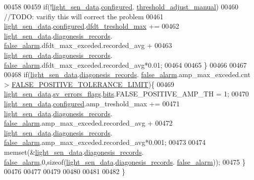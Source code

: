 \begin{DoxyCode}
00458 
00459          \textcolor{keywordflow}{if}(!\hyperlink{a00047_a53c98c9f84d5cecf0747bbe1f6b83696}{light\_sen\_data}.\hyperlink{a00024_a94b2d1f6ea4ab334c74d24984dd27843}{configured}.
      \hyperlink{a00021_a18e270a10094f045f20299b0f7e83085}{threshold\_adjust\_manual})
00460           \textcolor{comment}{//TODO: varifiy this will correct the problem}
00461           \hyperlink{a00047_a53c98c9f84d5cecf0747bbe1f6b83696}{light\_sen\_data}.\hyperlink{a00024_a94b2d1f6ea4ab334c74d24984dd27843}{configured}.\hyperlink{a00021_adf9a37828e447378b1d533185213316d}{dfdt\_treshold\_max} +=
00462           \hyperlink{a00047_a53c98c9f84d5cecf0747bbe1f6b83696}{light\_sen\_data}.\hyperlink{a00024_a7ae905b560513ad201e58c2f63375030}{diagonesis\_records}.
      \hyperlink{a00017_a799f50625c0c03f9404a59287810113d}{false\_alarm}.dfdt\_max\_exceded.recorded\_avg +
00463           \hyperlink{a00047_a53c98c9f84d5cecf0747bbe1f6b83696}{light\_sen\_data}.\hyperlink{a00024_a7ae905b560513ad201e58c2f63375030}{diagonesis\_records}.
      \hyperlink{a00017_a799f50625c0c03f9404a59287810113d}{false\_alarm}.dfdt\_max\_exceded.recorded\_avg*0.01;
00464 
00465       \}
00466 
00467 
00468       \textcolor{keywordflow}{if}(\hyperlink{a00047_a53c98c9f84d5cecf0747bbe1f6b83696}{light\_sen\_data}.\hyperlink{a00024_a7ae905b560513ad201e58c2f63375030}{diagonesis\_records}.
      \hyperlink{a00017_a799f50625c0c03f9404a59287810113d}{false\_alarm}.amp\_max\_exceded.cnt > \hyperlink{a00024_aa88a423475bb5b13601785eed80fb1b9}{FALSE\_POSITIVE\_TOLERANCE\_LIMIT})\{
00469           \hyperlink{a00047_a53c98c9f84d5cecf0747bbe1f6b83696}{light\_sen\_data}.\hyperlink{a00024_aaeec6b0609dba31393f337abf1cce3d3}{sv\_errors\_flags}.\hyperlink{a00022_ab81eb6fb4f1351ed07b4d6c4dd6f1959}{bits}.FALSE\_POSITIVE\_AMP\_TH = 1;
00470           \hyperlink{a00047_a53c98c9f84d5cecf0747bbe1f6b83696}{light\_sen\_data}.\hyperlink{a00024_a94b2d1f6ea4ab334c74d24984dd27843}{configured}.amp\_treshold\_max +=
00471           \hyperlink{a00047_a53c98c9f84d5cecf0747bbe1f6b83696}{light\_sen\_data}.\hyperlink{a00024_a7ae905b560513ad201e58c2f63375030}{diagonesis\_records}.
      \hyperlink{a00017_a799f50625c0c03f9404a59287810113d}{false\_alarm}.amp\_max\_exceded.recorded\_avg +
00472           \hyperlink{a00047_a53c98c9f84d5cecf0747bbe1f6b83696}{light\_sen\_data}.\hyperlink{a00024_a7ae905b560513ad201e58c2f63375030}{diagonesis\_records}.
      \hyperlink{a00017_a799f50625c0c03f9404a59287810113d}{false\_alarm}.amp\_max\_exceded.recorded\_avg*0.001;
00473 
00474            memset(&\hyperlink{a00047_a53c98c9f84d5cecf0747bbe1f6b83696}{light\_sen\_data}.\hyperlink{a00024_a7ae905b560513ad201e58c2f63375030}{diagonesis\_records}.
      \hyperlink{a00017_a799f50625c0c03f9404a59287810113d}{false\_alarm},0,\textcolor{keyword}{sizeof}(\hyperlink{a00047_a53c98c9f84d5cecf0747bbe1f6b83696}{light\_sen\_data}.\hyperlink{a00024_a7ae905b560513ad201e58c2f63375030}{diagonesis\_records}.
      \hyperlink{a00017_a799f50625c0c03f9404a59287810113d}{false\_alarm}));
00475       \}
00476 
00477 
00479 
00480 
00481 
00482 \}
\end{DoxyCode}


